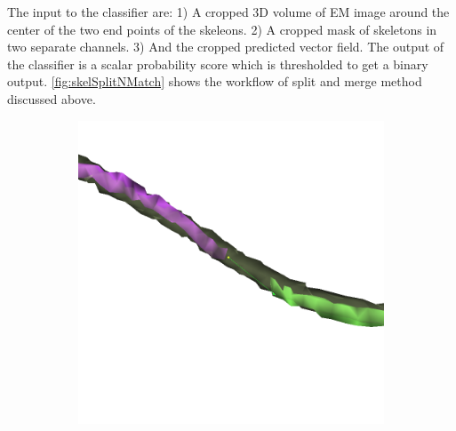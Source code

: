 The input to the classifier are: 1) A cropped 3D volume of EM image around the center of the two end points of the skeleons. 2) A cropped mask of skeletons in two separate channels. 3) And the cropped predicted vector field. The output of the classifier is a scalar probability score which is thresholded to get a binary output. \autoref{fig:skelSplitNMatch} shows the workflow of split and merge method discussed above.

\begin{figure}[htpb]
	\centering
	\begin{subfigure}[b]{0.3\textwidth}
		\centering
		\includegraphics[width=\textwidth]{data/images/matchingData/positive_2.png}
		\caption{\label{fig:positiveMatch}}
	\end{subfigure}
	\hspace{3mm}
	\begin{subfigure}[b]{0.3\textwidth}
		\centering

\end{subfigure}
\end{figure}
